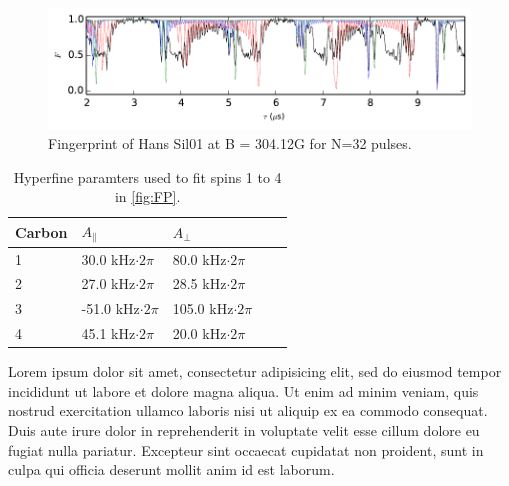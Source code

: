 

\begin{figure}[htbp]
    \centering
    \includegraphics{Img/Truefingerprint.pdf}
    \caption{Fingerprint of Hans Sil01 at B = 304.12G for N=32 pulses.}
    \label{fig:FP}
\end{figure}

\begin{table}[htbp]
    \begin{tabular}{lllll}
    Carbon &  $A_{\parallel} $ & $A_{\perp}$ \\ \hline
    1         & 30.0 kHz$\cdot 2 \pi$             & 80.0 kHz$\cdot 2 \pi$                \\
    2         & 27.0 kHz$\cdot 2 \pi$             & 28.5 kHz$\cdot 2 \pi$              \\
    3         & -51.0 kHz$\cdot 2 \pi$          & 105.0 kHz$\cdot 2 \pi$              \\
    4         & 45.1 kHz$\cdot 2 \pi$           & 20.0 kHz$\cdot 2 \pi$                \\
    \end{tabular}
    \caption{Hyperfine paramters used to fit spins 1 to 4 in \autoref{fig:FP}.}
    \label{tbl:HF_par}
\end{table}

Lorem ipsum dolor sit amet, consectetur adipisicing elit, sed do eiusmod
tempor incididunt ut labore et dolore magna aliqua. Ut enim ad minim veniam,
quis nostrud exercitation ullamco laboris nisi ut aliquip ex ea commodo
consequat. Duis aute irure dolor in reprehenderit in voluptate velit esse
cillum dolore eu fugiat nulla pariatur. Excepteur sint occaecat cupidatat non
proident, sunt in culpa qui officia deserunt mollit anim id est laborum.

